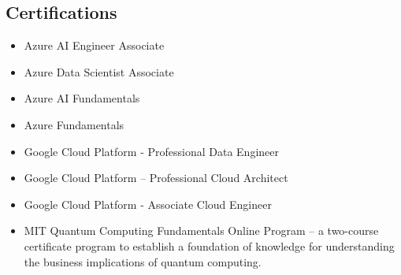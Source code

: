 \documentclass[11pt,a4paper,sans]{moderncv}        %
\begin{document}
\subsection{Certifications}
\begin{itemize}
\item Azure AI Engineer Associate
\item Azure Data Scientist Associate
\item Azure AI Fundamentals
\item Azure Fundamentals
\item Google Cloud Platform - Professional Data Engineer 
\item Google Cloud Platform – Professional Cloud Architect  
\item Google Cloud Platform - Associate Cloud Engineer 
\item MIT Quantum Computing Fundamentals Online Program – a two-course certificate program to establish a foundation of knowledge for understanding the business implications of quantum computing. 
\end{itemize}
\end{document}
